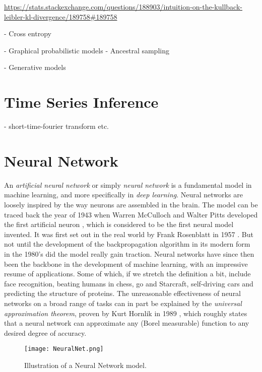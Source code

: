 \documentclass[../../thesis.tex]{subfiles}
\begin{document}
\url{https://stats.stackexchange.com/questions/188903/intuition-on-the-kullback-leibler-kl-divergence/189758#189758}

- Cross entropy 

- Graphical probabilistic models 
    - Ancestral sampling

- Generative models


\section{Time Series Inference}
- short-time-fourier transform etc.

\section{Neural Network}
An \textit{artificial neural network} or simply \textit{neural network} is a fundamental model in machine learning, and more specifically in \textit{deep learning}. Neural networks are loosely inspired by the way neurons are assembled in the brain. The model can be traced back the year of 1943 when Warren McCulloch and Walter Pitts developed the first artificial neuron \cite{MCCULLOCH199099}, which is considered to be the first neural model invented. It was first set out in the real world by Frank Rosenblatt in 1957 \cite{rosenblatt1957perceptron}. But not until the development of the backpropagation algorithm in its modern form in the 1980's did the model really gain traction. Neural networks have since then been the backbone in the development of machine learning, with an impressive resume of applications. Some of which, if we stretch the definition a bit, include face recognition, beating humans in chess, go and Starcraft, self-driving cars and predicting the structure of proteins. The unreasonable effectiveness of neural networks on a broad range of tasks can in part be explained by the \textit{universal approximation theorem}, proven by Kurt Hornlik in 1989 \cite{HORNIK1989359}, which roughly states that a neural network can approximate any (Borel measurable) function to any desired degree of accuracy. 

\begin{figure}
    \texttt{[image: NeuralNet.png]}
    \centering 
    \caption{Illustration of a Neural Network model.}
    \label{fig:NeuralNet}
\end{figure}
\end{document}
